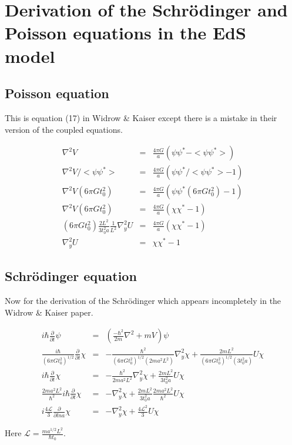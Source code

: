 \section{Derivation of the Schr\"odinger and Poisson equations in the EdS model}
\label{app_eds}
\subsection{Poisson equation}
This is equation (17) in Widrow \& Kaiser except there is a mistake in their version of the coupled equations.

\begin{eqnarray}
\nabla^2 V &=&  \frac{4\pi G}{a} (\psi\psi^* - <\psi \psi^*>) \\
\nabla^2 V / <\psi \psi^*> &=&  \frac{4\pi G}{a} (\psi\psi^*/<\psi \psi^*> - 1) \\
\nabla^2 V (6\pi G t_0^2) &=&  \frac{4\pi G}{a} (\psi\psi^* (6\pi G t_0^2) - 1) \\
\nabla^2 V (6\pi G t_0^2) &=&  \frac{4\pi G}{a} (\chi\chi^* - 1) \\
(6\pi G t_0^2) \frac{2 L^2}{3 t_0^2 a}  \frac{1}{L^2} \nabla_y^2 U &=& \frac{4\pi G}{a} (\chi\chi^* - 1) \\
\nabla_y^2 U &=& \chi\chi^* - 1
\end{eqnarray}

\subsection{Schr\"odinger equation}
Now for the derivation of the Schr\"odinger which appears incompletely in the Widrow \& Kaiser paper.

\begin{eqnarray}
i \hbar \frac{\partial}{\partial t} \psi &=& \left(\frac{-\hbar^2}{2 m} \nabla^2 +mV\right) \psi \\
\frac{i \hbar}{{(6\pi G t_0^2)}^{1/2}} \frac{\partial}{\partial t} \chi &=& -\frac{\hbar^2}{{(6\pi G t_0^2)}^{1/2}(2ma^2L^2)}\nabla_y^2 \chi + \frac{2m L^2}{{(6\pi G t_0^2)}^{1/2}(3 t_0^2 a)} U \chi \\
i \hbar \frac{\partial}{\partial t} \chi &=& -\frac{\hbar^2}{2ma^2L^2}\nabla_y^2 \chi + \frac{2m L^2}{3 t_0^2 a} U \chi \\
\frac{2ma^2L^2}{\hbar^2} i\hbar \frac{\partial}{\partial t} \chi &=& -\nabla_y^2 \chi +\frac{2m L^2}{3 t_0^2 a} \frac{2ma^2L^2}{\hbar^2} U \chi\\
i \frac{4\mathcal{L}}{3} \frac{\partial}{\partial ln a}\chi &=& -\nabla_y^2 \chi + \frac{4\mathcal{L}^2}{3} U \chi
\end{eqnarray}

\noindent Here $\mathcal{L} = \frac{m a^{1/2}L^2}{\hbar t_0}$.
